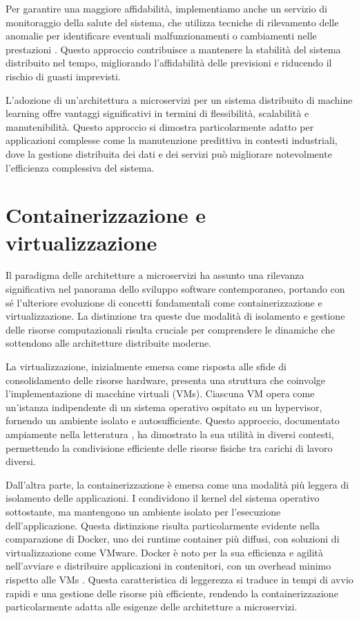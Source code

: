 Per garantire una maggiore affidabilità, implementiamo anche un servizio di monitoraggio della salute del sistema, che utilizza tecniche di rilevamento delle anomalie per identificare eventuali malfunzionamenti o cambiamenti nelle prestazioni \cite{ding2019using}. Questo approccio contribuisce a mantenere la stabilità del sistema distribuito nel tempo, migliorando l'affidabilità delle previsioni e riducendo il rischio di guasti imprevisti.

L'adozione di un'architettura a microservizi per un sistema distribuito di machine learning offre vantaggi significativi in termini di flessibilità, scalabilità e manutenibilità. Questo approccio si dimostra particolarmente adatto per applicazioni complesse come la manutenzione predittiva in contesti industriali, dove la gestione distribuita dei dati e dei servizi può migliorare notevolmente l'efficienza complessiva del sistema.

\section{Containerizzazione e virtualizzazione}

Il paradigma delle architetture a microservizi ha assunto una rilevanza significativa nel panorama dello sviluppo software contemporaneo, portando con sé l'ulteriore evoluzione di concetti fondamentali come containerizzazione e virtualizzazione. La distinzione tra queste due modalità di isolamento e gestione delle risorse computazionali risulta cruciale per comprendere le dinamiche che sottendono alle architetture distribuite moderne.

La virtualizzazione, inizialmente emersa come risposta alle sfide di consolidamento delle risorse hardware, presenta una struttura che coinvolge l'implementazione di macchine virtuali (VMs). Ciascuna VM opera come un'istanza indipendente di un sistema operativo ospitato su un hypervisor, fornendo un ambiente isolato e autosufficiente. Questo approccio, documentato ampiamente nella letteratura \cite{smith2005history}, ha dimostrato la sua utilità in diversi contesti, permettendo la condivisione efficiente delle risorse fisiche tra carichi di lavoro diversi.

Dall'altra parte, la containerizzazione è emersa come una modalità più leggera di isolamento delle applicazioni. I  condividono il kernel del sistema operativo sottostante, ma mantengono un ambiente isolato per l'esecuzione dell'applicazione. Questa distinzione risulta particolarmente evidente nella comparazione di Docker, uno dei runtime container più diffusi, con soluzioni di virtualizzazione come VMware. Docker è noto per la sua efficienza e agilità nell'avviare e distribuire applicazioni in contenitori, con un overhead minimo rispetto alle VMs \cite{turnbull2014docker}. Questa caratteristica di leggerezza si traduce in tempi di avvio rapidi e una gestione delle risorse più efficiente, rendendo la containerizzazione particolarmente adatta alle esigenze delle architetture a microservizi.

